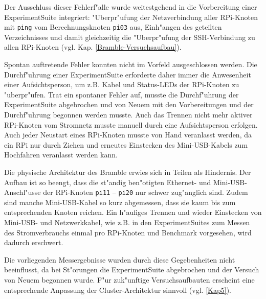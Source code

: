 \noindent 
Der Ausschluss dieser Fehlerf"alle wurde weitestgehend in die Vorbereitung einer ExperimentSuite integriert: "Uberpr"ufung der Netzverbindung aller RPi-Knoten mit \texttt{ping} vom Berechnungsknoten \texttt{pi03} aus, Einh"angen des geteilten Verzeichnisses und damit gleichzeitig die  "Uberpr"ufung der SSH-Verbindung zu allen RPi-Knoten (vgl. Kap. \ref{Bramble-Versuchsaufbau}). 

Spontan auftretende Fehler konnten nicht im Vorfeld ausgeschlossen werden. Die Durchf"uhrung einer ExperimentSuite erforderte daher immer die Anwesenheit einer Aufsichtsperson, um z.B. Kabel und Status-LEDs der RPi-Knoten zu "uberpr"ufen. Trat ein spontaner Fehler auf, musste die Durchf"uhrung der ExperimentSuite abgebrochen und von Neuem mit den Vorbereitungen und der Durchf"uhrung begonnen werden musste. Auch das Trennen nicht mehr aktiver RPi-Knoten vom Stromnetz musste manuell durch eine Aufsichtsperson erfolgen. Auch jeder Neustart eines RPi-Knoten musste von Hand veranlasst werden, da ein RPi nur durch Ziehen und erneutes Einstecken des Mini-USB-Kabels zum Hochfahren veranlasst werden kann. 

Die physische Architektur des Bramble erwies sich in Teilen als Hindernis. Der Aufbau ist so beengt, dass die st"andig ben"otigten Ethernet- und Mini-USB-Anschl"usse der RPi-Knoten \texttt{pi11} -- \texttt{pi20} nur schwer zug"anglich sind. Zudem sind manche Mini-USB-Kabel so kurz abgemessen, dass sie kaum bis zum entsprechenden Knoten reichen. Ein h"aufiges Trennen und wieder Einstecken von Mini-USB- und Netzwerkkabel, wie z.B. in den ExperimentSuites zum Messen des Stromverbrauchs einmal pro RPi-Knoten und Benchmark vorgesehen, wird dadurch erschwert. 

Die vorliegenden Messergebnisse wurden durch diese Gegebenheiten nicht beeinflusst, da bei St"orungen die ExperimentSuite abgebrochen und der Versuch von Neuem begonnen wurde. F"ur zuk"unftige Versuchsaufbauten erscheint eine entsprechende Anpassung der Cluster-Architektur sinnvoll (vgl. \ref{Kap5}).
\endinput 